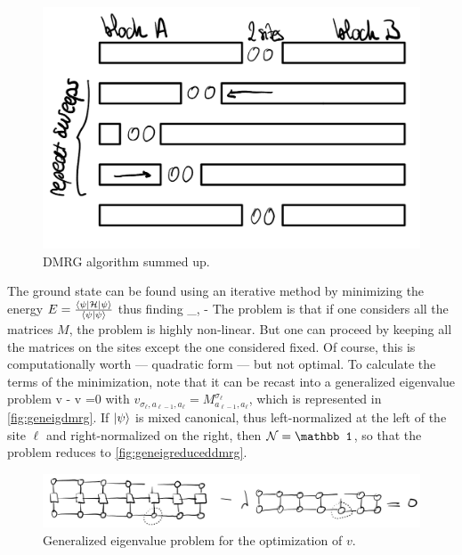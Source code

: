         \begin{figure}[h!]
            \centering
            \includegraphics[scale=0.2]{graphs/dmrgalgosumup.png}
            \caption{DMRG algorithm summed up.}
            \label{fig:dmrgalgosumup}
        \end{figure}

        The ground state can be found using an iterative method by minimizing the energy $E = \frac{\ev{\mc H}{\psi}}{\braket{\psi}}$ thus finding
        \be \min_{\ket \psi, \lambda}  - \lambda\braket{\psi} \ee
        The problem is that if one considers all the matrices $M$, the problem is highly non-linear. But one can proceed by keeping all the matrices on the sites except the one considered fixed. Of course, this is computationally worth --- quadratic form --- but not optimal. To calculate the terms of the minimization, note that it can be recast into a generalized eigenvalue problem
        \be {}v - \lambda {} v =0 \ee
        with $v_{\sigma_\ell,a_{\ell-1},a_\ell} = M^{\sigma_\ell}_{a_{\ell-1},a_\ell}$, which is represented in \autoref{fig:geneigdmrg}. If $\ket\psi$ is mixed canonical, thus left-normalized at the left of the site $\ell$ and right-normalized on the right, then $\mc N = \mathbb 1$, so that the problem reduces to \autoref{fig:geneigreduceddmrg}.

        \begin{figure}[h!]
            \centering
            \includegraphics[width=\linewidth]{graphs/geneigdmrg.png}
            \caption{Generalized eigenvalue problem for the optimization of $v$.}
            \label{fig:geneigdmrg}
        \end{figure}

